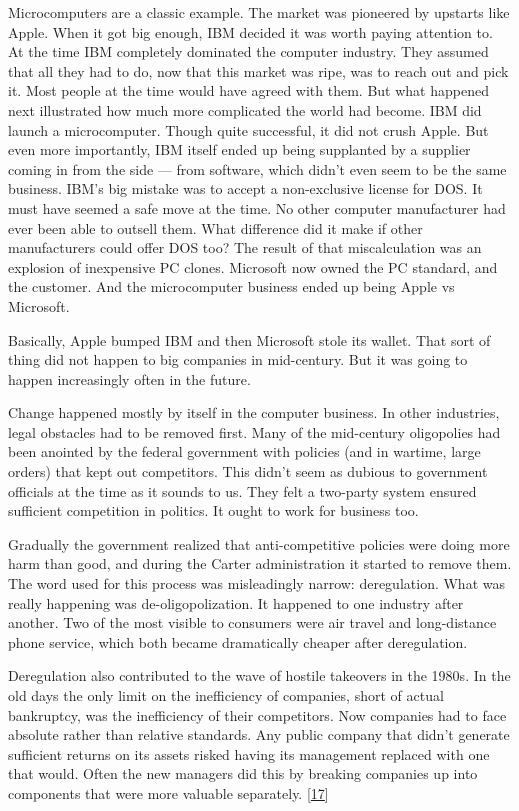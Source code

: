Microcomputers are a classic example. The market was pioneered by
upstarts like Apple. When it got big enough, IBM decided it was worth
paying attention to. At the time IBM completely dominated the computer
industry. They assumed that all they had to do, now that this market was
ripe, was to reach out and pick it. Most people at the time would have
agreed with them. But what happened next illustrated how much more
complicated the world had become. IBM did launch a microcomputer. Though
quite successful, it did not crush Apple. But even more importantly, IBM
itself ended up being supplanted by a supplier coming in from the side
--- from software, which didn't even seem to be the same business. IBM's
big mistake was to accept a non-exclusive license for DOS. It must have
seemed a safe move at the time. No other computer manufacturer had ever
been able to outsell them. What difference did it make if other
manufacturers could offer DOS too? The result of that miscalculation was
an explosion of inexpensive PC clones. Microsoft now owned the PC
standard, and the customer. And the microcomputer business ended up
being Apple vs Microsoft.

Basically, Apple bumped IBM and then Microsoft stole its wallet. That
sort of thing did not happen to big companies in mid-century. But it was
going to happen increasingly often in the future.

Change happened mostly by itself in the computer business. In other
industries, legal obstacles had to be removed first. Many of the
mid-century oligopolies had been anointed by the federal government with
policies (and in wartime, large orders) that kept out competitors. This
didn't seem as dubious to government officials at the time as it sounds
to us. They felt a two-party system ensured sufficient competition in
politics. It ought to work for business too.

Gradually the government realized that anti-competitive policies were
doing more harm than good, and during the Carter administration it
started to remove them. The word used for this process was misleadingly
narrow: deregulation. What was really happening was de-oligopolization.
It happened to one industry after another. Two of the most visible to
consumers were air travel and long-distance phone service, which both
became dramatically cheaper after deregulation.

Deregulation also contributed to the wave of hostile takeovers in the
1980s. In the old days the only limit on the inefficiency of companies,
short of actual bankruptcy, was the inefficiency of their competitors.
Now companies had to face absolute rather than relative standards. Any
public company that didn't generate sufficient returns on its assets
risked having its management replaced with one that would. Often the new
managers did this by breaking companies up into components that were
more valuable separately. {[}\hyperref[f17n]{17}{]}

